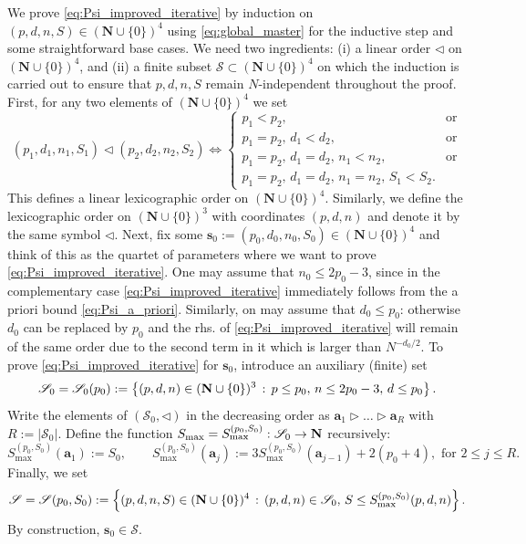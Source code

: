 \documentclass[10pt]{amsart}
\numberwithin{equation}{section}
\newcommand{\nc}{\normalcolor}
\newcommand{\N}{\mathbf{N}}
\begin{document}
We prove \eqref{eq:Psi_improved_iterative} by induction on $(p,d,n,S)\in (\N\cup\{0\})^4$ using \eqref{eq:global_master}
for  the inductive step
and some straightforward base cases. 
We need two ingredients: (i) a linear order $
\lhd$ on $(\N\cup\{0\})^4$, and (ii) a finite subset $\mathscr{S}\subset (\N\cup\{0\})^4$ on which the induction is carried out to ensure that $p,d,n,S$ remain $N$-independent throughout the proof. First, 
for any two elements of $(\N\cup\{0\})^4$ we set
\begin{equation}
(p_1,d_1,n_1,S_1) \lhd (p_2,d_2,n_2,S_2) \Longleftrightarrow
\begin{cases}
p_1<p_2,&\text{or}\\
p_1=p_2,\, d_1<d_2,&\text{or}\\
p_1=p_2,\, d_1=d_2,\,n_1<n_2,&\text{or}\\
p_1=p_2,\, d_1=d_2,\,n_1=n_2,\, S_1<S_2.
\end{cases}
\label{eq:def_lexicographic}
\end{equation}
This defines a linear lexicographic order on $(\mathbf{N}\cup\{0\})^4$. Similarly, we define the lexicographic order on $(\N\cup\{0\})^3$ with coordinates $(p,d,n)$ and denote it by the same symbol $\lhd$.  Next, fix some $\bm{s}_0:=(p_0,d_0,n_0,S_0)\in(\N\cup\{0\})^4$ and think of this as the quartet of parameters where we want to prove \eqref{eq:Psi_improved_iterative}. One may assume that $n_0\le 2p_0-3$, since in the complementary case \eqref{eq:Psi_improved_iterative} immediately follows from the a priori bound \eqref{eq:Psi_a_priori}. Similarly, on may assume that $d_0\le p_0$: otherwise $d_0$ can be replaced by $p_0$ and the rhs. of \eqref{eq:Psi_improved_iterative} will remain of the same order due to the second term in it which is larger than $N^{-d_0/2}$. \nc To prove \eqref{eq:Psi_improved_iterative} for $\bm{s}_0$, introduce an  auxiliary (finite) set
\begin{equation}
\mathscr{S}_0=\mathscr{S}_0(p_0)\nc:=\left\lbrace (p,d,n)\in(\N\cup\{0\})^3\,:\, p\le p_0,\, n\le 2p_0-3,\, d \le p_0\right\rbrace.
\end{equation}
Write the elements of $(\mathscr{S}_0,\lhd)$ in the decreasing order as $\bm{a}_1\rhd\ldots\rhd\bm{a}_R$ with $R:=|\mathscr{S}_0|$. Define the function $S_{\max} = S_{\max}^{(p_0,S_0)}\nc:\mathscr{S}_0\to\N$  recursively:
\begin{equation}
S_{\max}^{(p_0,S_0)}(\bm{a}_1):=S_0,\qquad S_{\max}^{(p_0,S_0)}(\bm{a}_j):=3S_{\max}^{(p_0,S_0)}(\bm{a}_{j-1})+2(p_0+4),\,\,\text{for}\,\, 2\le j\le R.
\end{equation}
Finally, we set  
\begin{equation}
\mathscr{S}=\mathscr{S}(p_0,S_0)\nc:=\left\lbrace (p,d,n,S)\in (\N\cup\{0\})^4\,:\, (p,d,n)\in\mathscr{S}_0,\, 
S\le S_{\max}^{(p_0,S_0)}(p,d,n)\right\rbrace.
\end{equation}
By construction, $\bm{s}_0\in \mathscr{S}$.\nc
\end{document}
